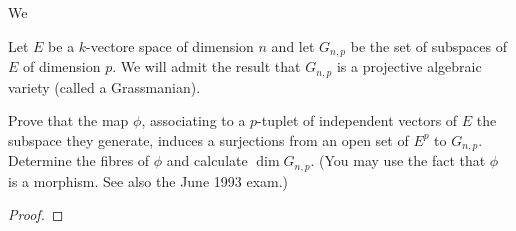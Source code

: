 \documentclass{article}
\begin{document}
 We


 Let $E$ be a $k$-vectore space of dimension $n$ and let $G_{n,p}$ be the set of subspaces of $E$ of
dimension $p$. We will admit the result that $G_{n,p}$ is a projective algebraic variety (called a Grassmanian).

Prove that the map $\phi$, associating to a $p$-tuplet of independent vectors of $E$ the subspace they generate, 
induces a surjections from an open set of $E^p$ to $G_{n,p}$. Determine the fibres of $\phi$ and calculate
$\dim G_{n,p}$. (You may use the fact that $\phi$ is a morphism. See also the June 1993 exam.)

\begin{proof}


\end{proof}
\end{document}
